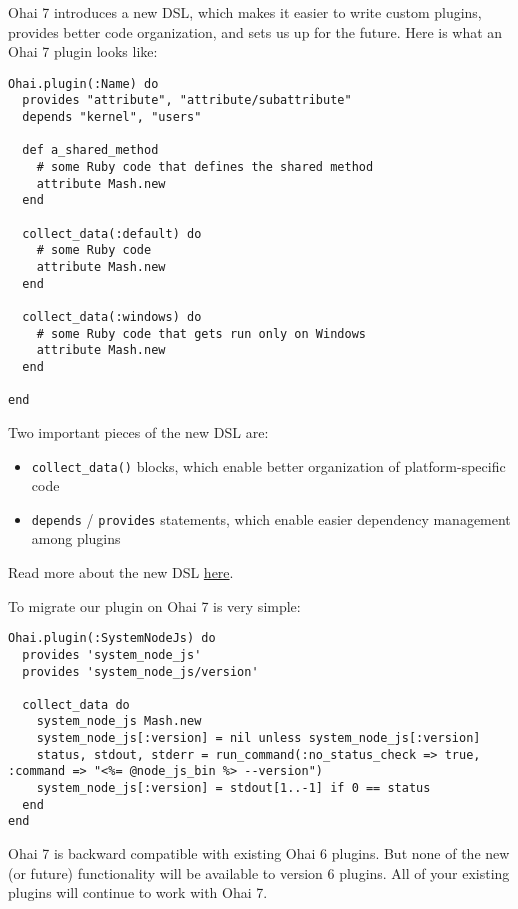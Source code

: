 Ohai 7 introduces a new DSL, which makes it easier to write custom plugins, provides better code organization, and sets us up for the future. Here is what an Ohai 7 plugin looks like:

\begin{lstlisting}[label=lst:cookbook-ohai9]
Ohai.plugin(:Name) do
  provides "attribute", "attribute/subattribute"
  depends "kernel", "users"

  def a_shared_method
    # some Ruby code that defines the shared method
    attribute Mash.new
  end

  collect_data(:default) do
    # some Ruby code
    attribute Mash.new
  end

  collect_data(:windows) do
    # some Ruby code that gets run only on Windows
    attribute Mash.new
  end

end
\end{lstlisting}

Two important pieces of the new DSL are:

\begin{itemize}
  \item \lstinline!collect_data()! blocks, which enable better organization of platform-specific code
  \item \lstinline!depends! / \lstinline!provides! statements, which enable easier dependency management among plugins
\end{itemize}

Read more about the new DSL \href{http://docs.opscode.com/ohai_custom.html}{here}.

To migrate our plugin on Ohai 7 is very simple:

\begin{lstlisting}[label=lst:cookbook-ohai10,title=my-server-cloud/site-cookbooks/my\_cool\_app/templates/default/plugin/system\_node\_js.rb.erb]
Ohai.plugin(:SystemNodeJs) do
  provides 'system_node_js'
  provides 'system_node_js/version'

  collect_data do
    system_node_js Mash.new
    system_node_js[:version] = nil unless system_node_js[:version]
    status, stdout, stderr = run_command(:no_status_check => true, :command => "<%= @node_js_bin %> --version")
    system_node_js[:version] = stdout[1..-1] if 0 == status
  end
end
\end{lstlisting}

Ohai 7 is backward compatible with existing Ohai 6 plugins. But none of the new (or future) functionality will be available to version 6 plugins. All of your existing plugins will continue to work with Ohai 7.
